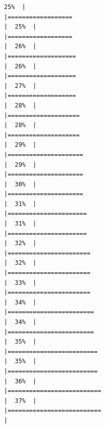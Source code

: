 \documentclass[
  english,
  man,a4paper,mask,floatsintext]{apa6}
\begin{document}
\begin{verbatim}
25%  |                                                                              |==================                                                    |  25%  |                                                                              |==================                                                    |  26%  |                                                                              |===================                                                   |  26%  |                                                                              |===================                                                   |  27%  |                                                                              |===================                                                   |  28%  |                                                                              |====================                                                  |  28%  |                                                                              |====================                                                  |  29%  |                                                                              |=====================                                                 |  29%  |                                                                              |=====================                                                 |  30%  |                                                                              |=====================                                                 |  31%  |                                                                              |======================                                                |  31%  |                                                                              |======================                                                |  32%  |                                                                              |=======================                                               |  32%  |                                                                              |=======================                                               |  33%  |                                                                              |=======================                                               |  34%  |                                                                              |========================                                              |  34%  |                                                                              |========================                                              |  35%  |                                                                              |=========================                                             |  35%  |                                                                              |=========================                                             |  36%  |                                                                              |==========================                                            |  37%  |                                                                              |==========================                                            |  
\end{verbatim}
\end{document}
